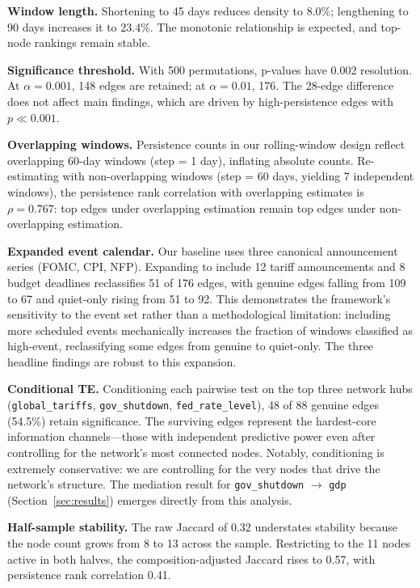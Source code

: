 \documentclass[12pt,letterpaper]{article}
\begin{document}
\textbf{Window length.} Shortening to 45 days reduces density to 8.0\%; lengthening to 90 days increases it to 23.4\%. The monotonic relationship is expected, and top-node rankings remain stable.

\textbf{Significance threshold.} With 500 permutations, p-values have 0.002 resolution. At $\alpha=0.001$, 148 edges are retained; at $\alpha=0.01$, 176. The 28-edge difference does not affect main findings, which are driven by high-persistence edges with $p \ll 0.001$.

\textbf{Overlapping windows.} Persistence counts in our rolling-window design reflect overlapping 60-day windows (step = 1 day), inflating absolute counts. Re-estimating with non-overlapping windows (step = 60 days, yielding 7 independent windows), the persistence rank correlation with overlapping estimates is $\rho = 0.767$: top edges under overlapping estimation remain top edges under non-overlapping estimation.

\textbf{Expanded event calendar.} Our baseline uses three canonical announcement series (FOMC, CPI, NFP). Expanding to include 12 tariff announcements and 8 budget deadlines reclassifies 51 of 176 edges, with genuine edges falling from 109 to 67 and quiet-only rising from 51 to 92. This demonstrates the framework's sensitivity to the event set rather than a methodological limitation: including more scheduled events mechanically increases the fraction of windows classified as high-event, reclassifying some edges from genuine to quiet-only. The three headline findings are robust to this expansion.

\textbf{Conditional TE.} Conditioning each pairwise test on the top three network hubs (\texttt{global\_tariffs}, \texttt{gov\_shutdown}, \texttt{fed\_rate\_level}), 48 of 88 genuine edges (54.5\%) retain significance. The surviving edges represent the hardest-core information channels---those with independent predictive power even after controlling for the network's most connected nodes. Notably, conditioning is extremely conservative: we are controlling for the very nodes that drive the network's structure. The mediation result for \texttt{gov\_shutdown} $\to$ \texttt{gdp} (Section~\ref{sec:results}) emerges directly from this analysis.

\textbf{Half-sample stability.} The raw Jaccard of 0.32 understates stability because the node count grows from 8 to 13 across the sample. Restricting to the 11 nodes active in both halves, the composition-adjusted Jaccard rises to 0.57, with persistence rank correlation 0.41.
\end{document}
